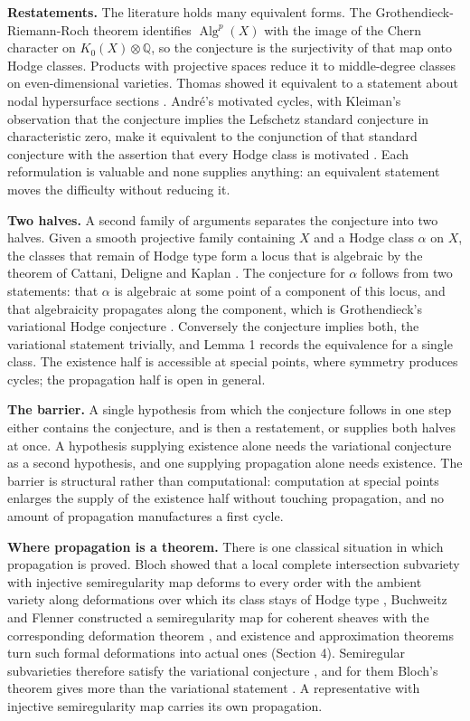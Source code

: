 \documentclass[10pt,twocolumn]{article}
\begin{document}
\textbf{Restatements.} The literature holds many equivalent forms. The
Grothendieck-Riemann-Roch theorem identifies \(\operatorname{Alg}^p(X)\)
with the image of the Chern character on \(K_0(X)\otimes\mathbb{Q}\), so
the conjecture is the surjectivity of that map onto Hodge classes.
Products with projective spaces reduce it to middle-degree classes on
even-dimensional varieties. Thomas showed it equivalent to a statement
about nodal hypersurface sections \cite{thomas2005}. André's motivated
cycles, with Kleiman's observation that the conjecture implies the
Lefschetz standard conjecture in characteristic zero, make it equivalent
to the conjunction of that standard conjecture with the assertion that
every Hodge class is motivated \cite{andre1996,kleiman1968}. Each
reformulation is valuable and none supplies anything: an equivalent
statement moves the difficulty without reducing it.

\textbf{Two halves.} A second family of arguments separates the
conjecture into two halves. Given a smooth projective family containing
\(X\) and a Hodge class \(\alpha\) on \(X\), the classes that remain of
Hodge type form a locus that is algebraic by the theorem of Cattani,
Deligne and Kaplan \cite{cdk1995}. The conjecture for \(\alpha\) follows
from two statements: that \(\alpha\) is algebraic at some point of a
component of this locus, and that algebraicity propagates along the
component, which is Grothendieck's variational Hodge conjecture
\cite{grothendieck1966}. Conversely the conjecture implies both, the
variational statement trivially, and Lemma 1 records the equivalence for
a single class. The existence half is accessible at special points,
where symmetry produces cycles; the propagation half is open in general.

\textbf{The barrier.} A single hypothesis from which the conjecture
follows in one step either contains the conjecture, and is then a
restatement, or supplies both halves at once. A hypothesis supplying
existence alone needs the variational conjecture as a second hypothesis,
and one supplying propagation alone needs existence. The barrier is
structural rather than computational: computation at special points
enlarges the supply of the existence half without touching propagation,
and no amount of propagation manufactures a first cycle.

\textbf{Where propagation is a theorem.} There is one classical
situation in which propagation is proved. Bloch showed that a local
complete intersection subvariety with injective semiregularity map
deforms to every order with the ambient variety along deformations over
which its class stays of Hodge type \cite{bloch1972}, Buchweitz and
Flenner constructed a semiregularity map for coherent sheaves with the
corresponding deformation theorem \cite{bf2003}, and existence and
approximation theorems turn such formal deformations into actual ones
(Section 4). Semiregular subvarieties therefore satisfy the variational
conjecture \cite{dankaur2016}, and for them Bloch's theorem gives more
than the variational statement \cite{nishinou2020}. A representative
with injective semiregularity map carries its own propagation.
\end{document}
